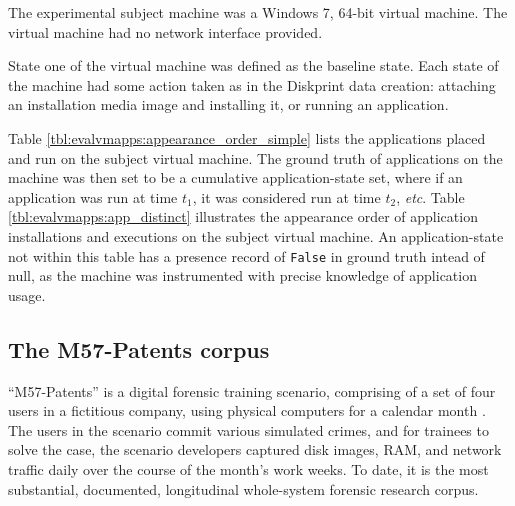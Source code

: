 \documentclass[11pt]{ucthesis}
\theoremstyle{plain}
\theoremstyle{definition}
\newcommand{\etc}{\emph{etc}\xspace}
\begin{document}
The experimental subject machine was a Windows 7, 64-bit virtual machine.  The virtual machine had no network interface provided.

State one of the virtual machine was defined as the baseline state.  Each state of the machine had some action taken as in the Diskprint data creation: attaching an installation media image and installing it, or running an application.

Table \ref{tbl:evalvmapps:appearance_order_simple} lists the applications placed and run on the subject virtual machine.  The ground truth of applications on the machine was then set to be a cumulative application-state set, where if an application was run at time $t_1$, it was considered run at time $t_2$, \etc.  Table \ref{tbl:evalvmapps:app_distinct} illustrates the appearance order of application installations and executions on the subject virtual machine.  An application-state not within this table has a presence record of \texttt{False} in ground truth intead of null, as the machine was instrumented with precise knowledge of application usage.


\subsection{The M57-Patents corpus}
\label{sec:m57patents}

``M57-Patents'' is a digital forensic training scenario, comprising of a set of four users in a fictitious company, using physical computers for a calendar month \cite{woods:adfsl11}.  The users in the scenario commit various simulated crimes, and for trainees to solve the case, the scenario developers captured disk images, RAM, and network traffic daily over the course of the month's work weeks.  To date, it is the most substantial, documented, longitudinal whole-system forensic research corpus.
\end{document}
